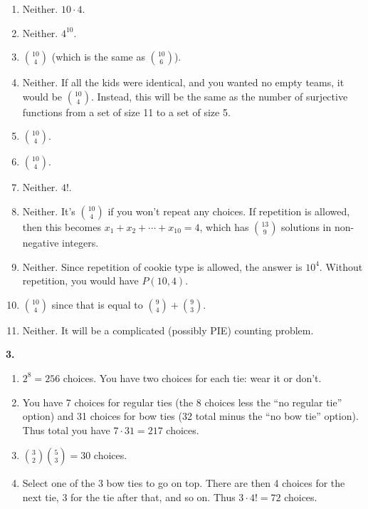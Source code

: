 \documentclass[10pt,]{book}
\theoremstyle{plain}
\theoremstyle{definition}
\theoremstyle{definition}
\theoremstyle{definition}
\numberwithin{equation}{chapter}
\begin{document}
\begin{enumerate}[label=(\alph*)]
\item\hypertarget{li-708}{}
                  Neither. \(10\cdot 4\).
\item\hypertarget{li-709}{}
                  Neither. \(4^{10}\).
\item\hypertarget{li-710}{}\({10 \choose 4}\) (which is the same as \({10 \choose 6}\)).%
\item\hypertarget{li-711}{}
                  Neither. If all the kids were identical, and you wanted no empty teams, it would be \({10 \choose 4}\). Instead, this will be the same as the number of surjective functions from a set of size 11 to a set of size 5.
\item\hypertarget{li-712}{}\({10 \choose 4}\).%
\item\hypertarget{li-713}{}\({10 \choose 4}\).%
\item\hypertarget{li-714}{}
                  Neither. \(4!\).
\item\hypertarget{li-715}{}
                  Neither. It's \({10 \choose 4}\) if you won't repeat any choices. If repetition is allowed, then this becomes \(x_1 + x_2 + \cdots +x_{10} = 4\), which has \({13 \choose 9}\) solutions in non-negative integers.
\item\hypertarget{li-716}{}
                  Neither. Since repetition of cookie type is allowed, the answer is \(10^4\). Without repetition, you would have \(P(10,4)\).
\item\hypertarget{li-717}{}\({10 \choose 4}\) since that is equal to \({9 \choose 4} + {9 \choose 3}\).%
\item\hypertarget{li-718}{}
                  Neither. It will be a complicated (possibly PIE) counting problem.
\end{enumerate}

\par\smallskip
\noindent\textbf{3.}\quad{} \leavevmode%
\begin{enumerate}[label=(\alph*)]
\item\hypertarget{li-723}{}\(2^8 = 256\) choices. You have two choices for each tie: wear it or don't.%
\item\hypertarget{li-724}{}
                You have 7 choices for regular ties (the 8 choices less the ``no regular tie'' option) and 31 choices for bow ties (32 total minus the ``no bow tie'' option). Thus total you have \(7 \cdot 31 = 217\) choices.
\item\hypertarget{li-725}{}\({3\choose 2}{5\choose 3} = 30\) choices.%
\item\hypertarget{li-726}{}
                Select one of the 3 bow ties to go on top. There are then 4 choices for the next tie, 3 for the tie after that, and so on. Thus \(3\cdot 4! = 72\) choices.
\end{enumerate}
\end{document}
